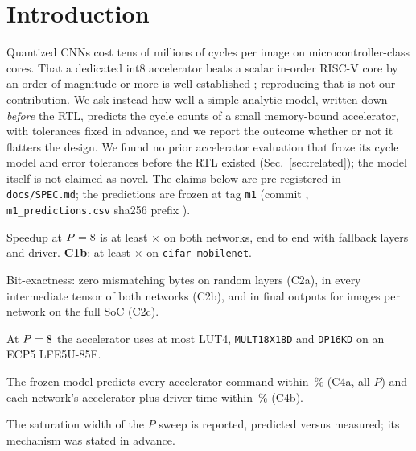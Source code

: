 \documentclass[conference]{IEEEtran}
\begin{document}
\section{Introduction}
Quantized CNNs cost tens of millions of cycles per image on microcontroller-class cores. That a dedicated int8 accelerator beats a scalar in-order RISC-V core by an order of magnitude or more is well established \cite{genc2021gemmini,prakash2023cfu,moreau2018vta}; reproducing that is not our contribution. We ask instead how well a simple analytic model, written down \emph{before} the RTL, predicts the cycle counts of a small memory-bound accelerator, with tolerances fixed in advance, and we report the outcome whether or not it flatters the design. We found no prior accelerator evaluation that froze its cycle model and error tolerances before the RTL existed (Sec.~\ref{sec:related}); the model itself is not claimed as novel. The claims below are pre-registered in \texttt{docs/SPEC.md}; the predictions are frozen at tag \texttt{m1} (commit \texttt{\MOneCommitShort}, \texttt{m1\_predictions.csv} sha256 prefix \texttt{\MOneCsvShaShort}).

\begin{description}\setlength{\itemsep}{0pt}
\item[C1] Speedup at $P=8$ is at least \ThreshCone$\times$ on both networks, end to end with fallback layers and driver. \textbf{C1b}: at least \ThreshConeB$\times$ on \texttt{cifar\_mobilenet}.
\item[C2] Bit-exactness: zero mismatching bytes on \RandomLayers{} random layers (C2a), in every intermediate tensor of both networks (C2b), and in final outputs for \ImagesCtwoC{} images per network on the full SoC (C2c).
\item[C3] At $P=8$ the accelerator uses at most \BudgetLut{} LUT4, \BudgetMult{} \texttt{MULT18X18D} and \BudgetBram{} \texttt{DP16KD} on an ECP5 LFE5U-85F.
\item[C4] The frozen model predicts every accelerator command within \ThreshFourA\,\% (C4a, all $P$) and each network's accelerator-plus-driver time within \ThreshFourB\,\% (C4b).
\item[C5] The saturation width of the $P$ sweep is reported, predicted versus measured; its mechanism was stated in advance.
\end{description}
\end{document}
